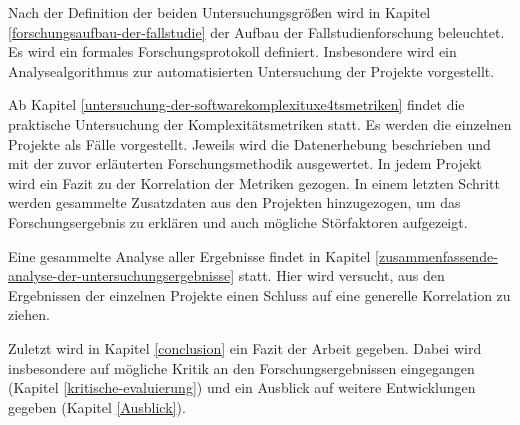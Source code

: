 Nach der Definition der beiden Untersuchungsgrößen wird in Kapitel \ref{forschungsaufbau-der-fallstudie} der
Aufbau der Fallstudienforschung beleuchtet. Es wird ein formales
Forschungsprotokoll definiert. Insbesondere wird ein Analysealgorithmus
zur automatisierten Untersuchung der Projekte vorgestellt.

Ab Kapitel \ref{untersuchung-der-softwarekomplexituxe4tsmetriken} findet die praktische Untersuchung der Komplexitätsmetriken
statt. Es werden die einzelnen Projekte als Fälle vorgestellt. Jeweils
wird die Datenerhebung beschrieben und mit der zuvor erläuterten
Forschungsmethodik ausgewertet. In jedem Projekt wird ein Fazit zu der
Korrelation der Metriken gezogen. In einem letzten Schritt werden
gesammelte Zusatzdaten aus den Projekten hinzugezogen, um das
Forschungsergebnis zu erklären und auch mögliche Störfaktoren
aufgezeigt.

Eine gesammelte Analyse aller Ergebnisse findet in Kapitel \ref{zusammenfassende-analyse-der-untersuchungsergebnisse} statt. Hier
wird versucht, aus den Ergebnissen der einzelnen Projekte einen Schluss
auf eine generelle Korrelation zu ziehen.

Zuletzt wird in Kapitel \ref{conclusion} ein Fazit der Arbeit gegeben. Dabei wird
insbesondere auf mögliche Kritik an den Forschungsergebnissen
eingegangen (Kapitel \ref{kritische-evaluierung}) und ein Ausblick auf weitere Entwicklungen
gegeben (Kapitel \ref{Ausblick}).